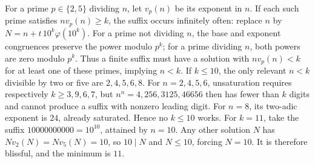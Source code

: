 For a prime $p\in\{2,5\}$ dividing $n$, let $v_p(n)$ be its exponent in $n$. If each such prime satisfies $nv_p(n)\ge k$, the suffix occurs infinitely often: replace $n$ by $N=n+t\,10^k\varphi(10^k)$. For a prime not dividing $n$, the base and exponent congruences preserve the power modulo $p^k$; for a prime dividing $n$, both powers are zero modulo $p^k$. Thus a finite suffix must have a solution with $nv_p(n)<k$ for at least one of these primes, implying $n<k$. If $k\le10$, the only relevant $n<k$ divisible by two or five are $2,4,5,6,8$. For $n=2,4,5,6$, unsaturation requires respectively $k\ge3,9,6,7$, but $n^n=4,256,3125,46656$ then has fewer than $k$ digits and cannot produce a suffix with nonzero leading digit. For $n=8$, its two-adic exponent is $24$, already saturated. Hence no $k\le10$ works. For $k=11$, take the suffix $10000000000=10^{10}$, attained by $n=10$. Any other solution $N$ has $Nv_2(N)=Nv_5(N)=10$, so $10\mid N$ and $N\le10$, forcing $N=10$. It is therefore blissful, and the minimum is $\boxed{11}$.
